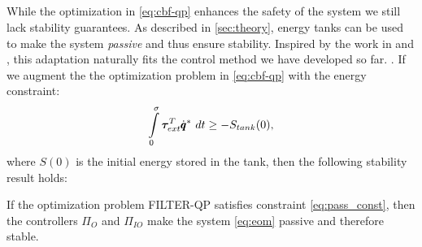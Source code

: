 \subsection{ }
While the optimization in \eqref{eq:cbf-qp} enhances the safety of the system we still lack stability guarantees. As described in \sect \ref{sec:theory}, energy tanks can be used to make the system \emph{passive} and thus ensure stability. Inspired by the work in \cite{benzi2021optimization} and \cite{shahriari2018valve}, this adaptation naturally fits the control method we have developed so far. . 
If we augment the the optimization problem in \eqref{eq:cbf-qp} with the energy constraint:
\begin{equation}\label{eq:pass_const}
    \int\limits_{0}^{\sigma} \boldsymbol{\tau}_{ext}^T \dot{\pmb{q}}^* \ dt \geq -S_{tank}(0),
\end{equation}
where $S(0)$ is the initial energy stored in the tank, then the following stability result holds:

\begin{theorem}
If the optimization problem FILTER-QP satisfies constraint \eqref{eq:pass_const}, then the controllers $\Pi_O$ and $\Pi_{IO}$ make the system \eqref{eq:eom} passive and therefore stable. 
\end{theorem}

